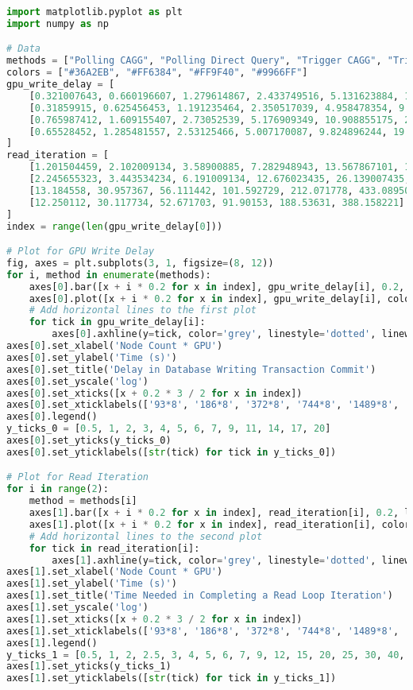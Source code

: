 \begin{lstlisting}[language=Python]
import matplotlib.pyplot as plt
import numpy as np

# Data
methods = ["Polling CAGG", "Polling Direct Query", "Trigger CAGG", "Trigger in Memory"]
colors = ["#36A2EB", "#FF6384", "#FF9F40", "#9966FF"]
gpu_write_delay = [
    [0.321007643, 0.660196607, 1.279614867, 2.433749516, 5.131623884, 11.624568741],
    [0.31859915, 0.625456453, 1.191235464, 2.350517039, 4.958478354, 9.977873813],
    [0.765987412, 1.609155407, 2.73052539, 5.176909349, 10.908855175, 20.96940738],
    [0.65528452, 1.285481557, 2.53125466, 5.007170087, 9.824896244, 19.604722893]
]
read_iteration = [
    [1.201504459, 2.102009134, 3.58900885, 7.282948943, 13.567867101, 18.581255946],
    [2.245655323, 3.443534234, 6.191009134, 12.676023435, 26.139007435, 55.204802484],
    [13.184558, 30.957367, 56.111442, 101.592729, 212.071778, 433.089509],
    [12.250112, 30.117734, 52.671703, 91.90153, 188.53631, 388.158221]
]
index = range(len(gpu_write_delay[0]))

# Plot for GPU Write Delay
fig, axes = plt.subplots(3, 1, figsize=(8, 12))
for i, method in enumerate(methods):
    axes[0].bar([x + i * 0.2 for x in index], gpu_write_delay[i], 0.2, label=method, color=colors[i])
    axes[0].plot([x + i * 0.2 for x in index], gpu_write_delay[i], color=colors[i], marker='o', linewidth=1, markersize=2)
    # Add horizontal lines to the first plot
    for tick in gpu_write_delay[i]:
        axes[0].axhline(y=tick, color='grey', linestyle='dotted', linewidth=0.3)
axes[0].set_xlabel('Node Count * GPU')
axes[0].set_ylabel('Time (s)')
axes[0].set_title('Delay in Database Writing Transaction Commit')
axes[0].set_yscale('log')
axes[0].set_xticks([x + 0.2 * 3 / 2 for x in index])
axes[0].set_xticklabels(['93*8', '186*8', '372*8', '744*8', '1489*8', '2978*8'])
axes[0].legend()
y_ticks_0 = [0.5, 1, 2, 3, 4, 5, 6, 7, 9, 11, 14, 17, 20]
axes[0].set_yticks(y_ticks_0)
axes[0].set_yticklabels([str(tick) for tick in y_ticks_0])

# Plot for Read Iteration
for i in range(2):
    method = methods[i]
    axes[1].bar([x + i * 0.2 for x in index], read_iteration[i], 0.2, label=method, color=colors[i])
    axes[1].plot([x + i * 0.2 for x in index], read_iteration[i], color=colors[i], marker='o', linewidth=1, markersize=2)
    # Add horizontal lines to the second plot
    for tick in read_iteration[i]:
        axes[1].axhline(y=tick, color='grey', linestyle='dotted', linewidth=0.3)
axes[1].set_xlabel('Node Count * GPU')
axes[1].set_ylabel('Time (s)')
axes[1].set_title('Time Needed in Completing a Read Loop Iteration')
axes[1].set_yscale('log')
axes[1].set_xticks([x + 0.2 * 3 / 2 for x in index])
axes[1].set_xticklabels(['93*8', '186*8', '372*8', '744*8', '1489*8', '2978*8'])
axes[1].legend()
y_ticks_1 = [0.5, 1, 2, 2.5, 3, 4, 5, 6, 7, 9, 12, 15, 20, 25, 30, 40, 50, 60]
axes[1].set_yticks(y_ticks_1)
axes[1].set_yticklabels([str(tick) for tick in y_ticks_1])


\end{lstlisting}
